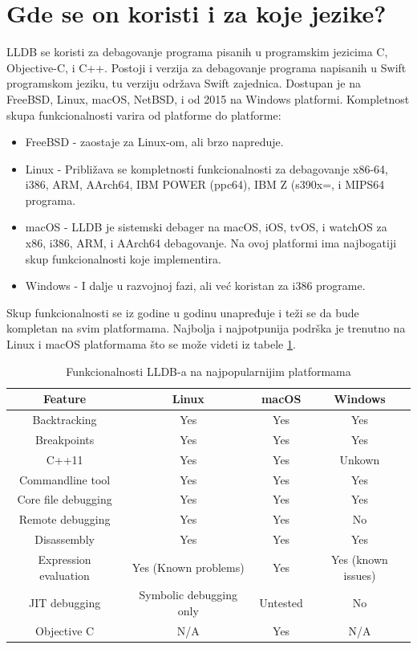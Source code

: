 \documentclass[a4paper]{article}
\begin{document}
\section{Gde se on koristi i za koje jezike? }
\label{sec: Gde se on koristi i za koje jezike?}
LLDB se koristi za debagovanje programa pisanih u programskim jezicima C, Objective-C, i C++. Postoji i verzija za debagovanje programa napisanih u Swift programskom jeziku, tu verziju održava Swift zajednica. 
Dostupan je na FreeBSD, Linux, macOS, NetBSD, i od 2015 na Windows platformi. Kompletnost skupa funkcionalnosti varira od platforme do platforme\cite{lldb_status}:
\begin{itemize}
\item FreeBSD - zaostaje za Linux-om, ali brzo napreduje.
\item Linux - Približava se kompletnosti funkcionalnosti za debagovanje x86-64, i386, ARM, AArch64, IBM POWER (ppc64), IBM Z (s390x=, i MIPS64 programa.
\item macOS - LLDB je sistemski debager na macOS, iOS, tvOS, i watchOS za x86, i386, ARM, i AArch64 debagovanje. Na ovoj platformi ima najbogatiji skup funkcionalnosti koje implementira.
\item Windows - I dalje u razvojnoj fazi, ali već koristan za i386 programe.
\end{itemize}
Skup funkcionalnosti se iz godine u godinu unapređuje i teži se da bude kompletan na svim platformama. Najbolja i najpotpunija podrška je trenutno na Linux i macOS platformama što se može videti iz tabele \ref{tab:table lldb features}.

\begin{table}[h!]
\center
\caption{Funkcionalnosti LLDB-a na najpopularnijim platformama}
\label{tab:table lldb features}
\begin{tabular}{|c|c c c|} 
 \hline
 Feature & Linux & macOS & Windows \\ [0.5ex] 
 \hline
 Backtracking & Yes & Yes & Yes \\ 
 Breakpoints & Yes & Yes & Yes \\
 C++11 & Yes & Yes & Unkown \\
 Commandline tool & Yes & Yes & Yes \\
 Core file debugging  & Yes & Yes & Yes \\
  Remote debugging & Yes & Yes & No\\ [1ex] 
 Disassembly & Yes & Yes & Yes  \\
 Expression evaluation & Yes (Known problems)& Yes & Yes (known issues) \\
 JIT debugging & Symbolic debugging only & Untested & No \\
 Objective C & N/A & Yes & N/A \\
 \hline
\end{tabular}
\end{table}
\end{document}
